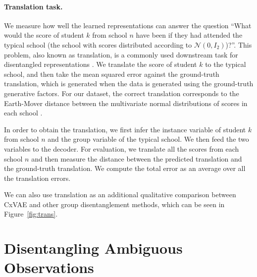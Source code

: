 \documentclass{article} %
\newcommand{\todo}[1]{\textcolor{red}{#1}}
\begin{document}
\paragraph{Translation task.} We measure how well the learned representations can answer the question ``What would the score of student $k$ from school $n$ have been if they had attended the typical school (the school with scores distributed according to $\mathcal{N} (0, I_2)$)?''. This problem, also known as translation, is a commonly used downstream task for disentangled representations \citep{Tenenbaum2000SeparatingSA}. We translate the score of student $k$ to the typical school, and then take the mean squared error against the ground-truth translation, which is generated when the data is generated using the ground-truth generative factors. For our dataset, the correct translation corresponds to the Earth-Mover distance between the multivariate normal distributions of scores in each school \citep{Knott1984On}.


In order to obtain the translation, we first infer the instance variable of student $k$ from school $n$ and the group variable of the typical school. We then feed the two variables to the decoder. For evaluation, we translate all the scores from each school $n$ and then measure the distance between the predicted translation and the ground-truth translation. We compute the total error as an average over all the translation errors.

We can also use translation as an additional qualitative comparison between CxVAE and other group disentanglement methods, which can be seen in Figure~\ref{fig:trans}.

\section{Disentangling Ambiguous Observations}
\end{document}
